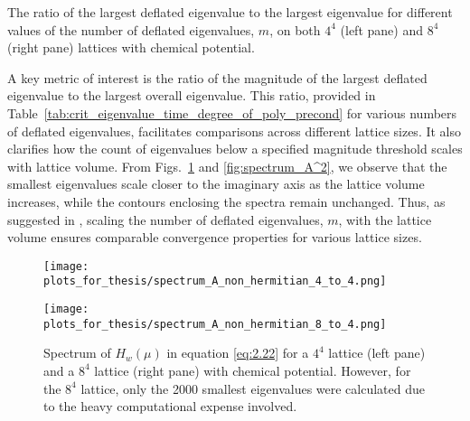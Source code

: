 \begin{table}[H]
    \centering
    \label{tab:crit_eigenvalue_time_degree_of_poly_precond} %
    \begin{minipage}{0.45\textwidth}
        \centering
    \end{minipage}
    \hspace{0.02\textwidth} %
    \begin{minipage}{0.45\textwidth}
        \centering
        
    \end{minipage}
    \caption{\small The ratio of the largest deflated eigenvalue to the largest eigenvalue for different values of the number of deflated eigenvalues, $m$, on both $4^4$ (left pane) and $8^4$ (right pane) lattices with chemical potential.}
\end{table}

A key metric of interest is the ratio of the magnitude of the largest deflated eigenvalue to the largest overall eigenvalue. This ratio, provided in Table~\ref{tab:crit_eigenvalue_time_degree_of_poly_precond} for various numbers of deflated eigenvalues, facilitates comparisons across different lattice sizes. It also clarifies how the count of eigenvalues below a specified magnitude threshold scales with lattice volume. From Figs.~\ref{fig:spectrum_A} and \ref{fig:spectrum_A^2}, we observe that the smallest eigenvalues scale closer to the imaginary axis as the lattice volume increases, while the contours enclosing the spectra remain unchanged. Thus, as suggested in \cite{11}, scaling the number of deflated eigenvalues, $m$, with the lattice volume ensures comparable convergence properties for various lattice sizes.

\begin{figure}[H]
    \centering
    \begin{minipage}{0.45\textwidth}
        \centering
        \texttt{[image: plots\_for\_thesis/spectrum\_A\_non\_hermitian\_4\_to\_4.png]} %
    \end{minipage}%
    \hspace{0.02\textwidth} %
    \begin{minipage}{0.45\textwidth}
        \centering
        \texttt{[image: plots\_for\_thesis/spectrum\_A\_non\_hermitian\_8\_to\_4.png]} %
    \end{minipage}
    \caption{\small Spectrum of $ H_w(\mu)$ in equation \ref{eq:2.22} for a $4^4$ lattice (left pane) and a $8^4$ lattice (right pane) with chemical potential. However, for the $8^4$ lattice, only the 2000 smallest eigenvalues were calculated due to the heavy computational expense involved.}
    \label{fig:spectrum_A}
\end{figure}

